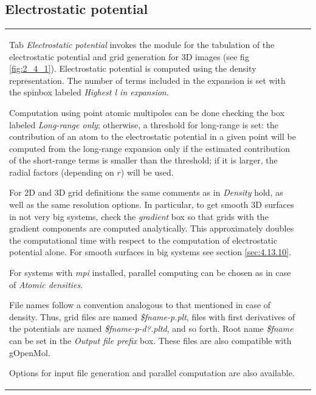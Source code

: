 \documentclass[10pt]{article}
\begin{document}
\subsection{Electrostatic potential \label{sec:2.4}}

\begin{tabular}{lr}
\hspace*{-3mm}
\begin{minipage}{.6\linewidth}
Tab {\it Electrostatic potential} invokes the module for the
tabulation of the electrostatic potential and grid generation for 3D images (see
fig \ref{fig:2_4_1}). Electrostatic potential is computed
using
the density representation. The number of terms included in the expansion is set
with the spinbox labeled {\it Highest l in expansion}. 

Computation using point atomic multipoles can be done checking the box labeled 
{\it Long-range only}\index{electrostatic potential!long-range}; otherwise, a
threshold for long-range is set: the contribution of an atom to the
electrostatic potential in a given point will be computed from the long-range
expansion only if the estimated contribution of the short-range terms is smaller than the
threshold; if it is larger, the radial factors (depending on $r$) will
be used.

For 2D and 3D grid definitions the same comments as in {\it
Density} hold, as well as the same resolution options. 
In particular, to get smooth 3D surfaces in not very big systems, check the {\it 
gradient}\index{electrostatic potential!gradient} box so that grids with the gradient 
components are computed analytically. This approximately doubles the computational time 
with respect to the computation of electrostatic potential alone. For smooth surfaces in big systems see section \ref{sec:4.13.10}\index{smooth surfaces}.

For systems with {\it mpi} installed, parallel computing can be chosen as in 
case of {\it Atomic densities}.

File names follow a convention analogous to that mentioned
in case of density. Thus, grid files\index{electrostatic potential!grid} are
named {\it \$fname-p.plt}, files with first derivatives of the potentials
are named {\it \$fname-p-d?.pltd}, and so forth. Root name {\it \$fname} can be
set in the {\it Output file prefix} box. These files are also
compatible with gOpenMol.

Options for input file generation and parallel computation are also available.
\end{minipage}
&
\begin{minipage}{.4\linewidth}


\end{minipage}
\end{tabular}
\end{document}
